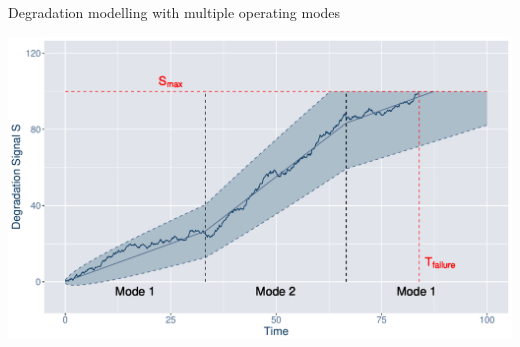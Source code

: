 \documentclass[slides]{beamer}
\begin{document}
\appendix
\begin{frame}[allowframebreaks]
    \tiny
    
    
\end{frame}

%    


\begin{frame}{Degradation modelling with multiple operating modes}
\begin{center}
    \includegraphics[scale=0.42]{example-wiener-om.pdf} \\
\end{center}
\end{frame}
\end{document}
